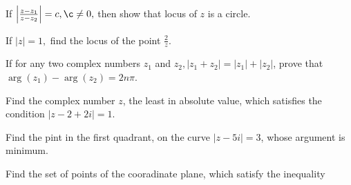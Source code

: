 \item If $\left|\frac{z - z_1}{z - z_2}\right| = c, \c\neq 0,$ then show that locus of $z$ is a circle.
\item If $|z| = 1,$ find the locus of the point $\frac{2}{z}$.
\item If for any two complex numbers $z_1$ and $z_2, |z_1 + z_2| = |z_1| + |z_2|$, prove that $\arg(z_1) - \arg(z_2) = 2n\pi$.
\item Find the complex number $z$, the least in absolute value, which satisfies the condition $|z - 2 + 2i| = 1$.
\item Find the pint in the first quadrant, on the curve $|z - 5i| = 3$, whose argument is minimum.
\item Find the set of points of the cooradinate plane, which satisfy the inequality


